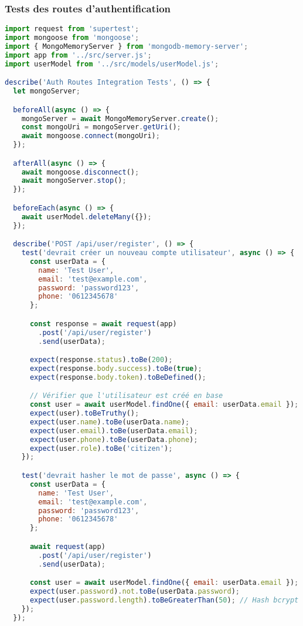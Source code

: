 \subsubsection{Tests des routes d'authentification}

\begin{lstlisting}[language=JavaScript, caption=authRoutes.integration.test.js]
import request from 'supertest';
import mongoose from 'mongoose';
import { MongoMemoryServer } from 'mongodb-memory-server';
import app from '../src/server.js';
import userModel from '../src/models/userModel.js';

describe('Auth Routes Integration Tests', () => {
  let mongoServer;

  beforeAll(async () => {
    mongoServer = await MongoMemoryServer.create();
    const mongoUri = mongoServer.getUri();
    await mongoose.connect(mongoUri);
  });

  afterAll(async () => {
    await mongoose.disconnect();
    await mongoServer.stop();
  });

  beforeEach(async () => {
    await userModel.deleteMany({});
  });

  describe('POST /api/user/register', () => {
    test('devrait créer un nouveau compte utilisateur', async () => {
      const userData = {
        name: 'Test User',
        email: 'test@example.com',
        password: 'password123',
        phone: '0612345678'
      };

      const response = await request(app)
        .post('/api/user/register')
        .send(userData);

      expect(response.status).toBe(200);
      expect(response.body.success).toBe(true);
      expect(response.body.token).toBeDefined();

      // Vérifier que l'utilisateur est créé en base
      const user = await userModel.findOne({ email: userData.email });
      expect(user).toBeTruthy();
      expect(user.name).toBe(userData.name);
      expect(user.email).toBe(userData.email);
      expect(user.phone).toBe(userData.phone);
      expect(user.role).toBe('citizen');
    });

    test('devrait hasher le mot de passe', async () => {
      const userData = {
        name: 'Test User',
        email: 'test@example.com',
        password: 'password123',
        phone: '0612345678'
      };

      await request(app)
        .post('/api/user/register')
        .send(userData);

      const user = await userModel.findOne({ email: userData.email });
      expect(user.password).not.toBe(userData.password);
      expect(user.password.length).toBeGreaterThan(50); // Hash bcrypt
    });
  });


\end{lstlisting}
